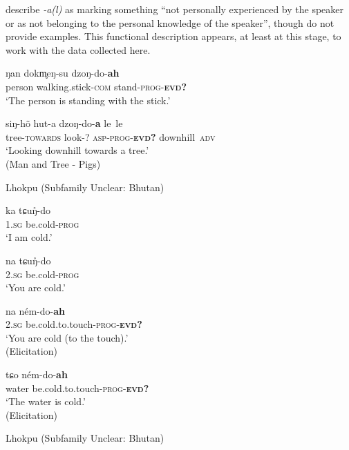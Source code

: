 \cite[20-21]{Grollmann2018} describe \textit{-a(l)} as marking something ``not personally experienced by the speaker or as not belonging to the personal knowledge of the speaker'', though do not provide examples. This functional description appears, at least at this stage, to work with the data collected here.

\begin{exe}
       \ex\label{e:Methods:LhokpuVerbal}
       \begin{xlist}
              \ex \label{e:Methods:LhokpuVerbal:coda}
              \gll ŋan dokm̥eŋ-su dzoŋ-do-\textbf{ah} \\
              person walking.stick-\textsc{com} stand-\textsc{prog-\textbf{evd?}} \\
              \glt `The person is standing with the stick.'

              \ex \label{e:Methods:LhokpuVerbal:nocoda}
              \gll siŋ-hõ hut-a dzoŋ-do-\textbf{a} le~le \\
              tree-\textsc{towards} look-? \textsc{asp-prog-\textbf{evd?}} downhill~\textsc{adv} \\
              \glt `Looking downhill towards a tree.' \\
              (Man and Tree - Pigs)


       \end{xlist}
       Lhokpu (Subfamily Unclear: Bhutan)
\end{exe}

\begin{exe}
       \ex\label{e:Methods:LhokpuVerbal2}
       \begin{xlist}

              \ex \label{e:Methods:LhokpuVerbal:cold}
              \gll ka tɕuŋ̊-do \\
              \textsc{1.sg} be.cold-\textsc{prog} \\
              \glt `I am cold.'

              \ex[*] \label{e:Methods:LhokpuVerbal:cold2s}
              \gll na tɕuŋ̊-do \\
              \textsc{2.sg} be.cold-\textsc{prog} \\
              \glt `You are cold.'

              \ex \label{e:Methods:LhokpuVerbal:coldevid2}
              \gll na ném-do-\textbf{ah} \\
              \textsc{2.sg} be.cold.to.touch-\textsc{prog-\textbf{evd?}} \\
              \glt `You are cold (to the touch).' \\
              (Elicitation)

              \ex \label{e:Methods:LhokpuVerbal:coldevid}
              \gll tɕo ném-do-\textbf{ah} \\
              water be.cold.to.touch-\textsc{prog-\textbf{evd?}} \\
              \glt `The water is cold.' \\
              (Elicitation)


       \end{xlist}
       Lhokpu (Subfamily Unclear: Bhutan)
\end{exe}

